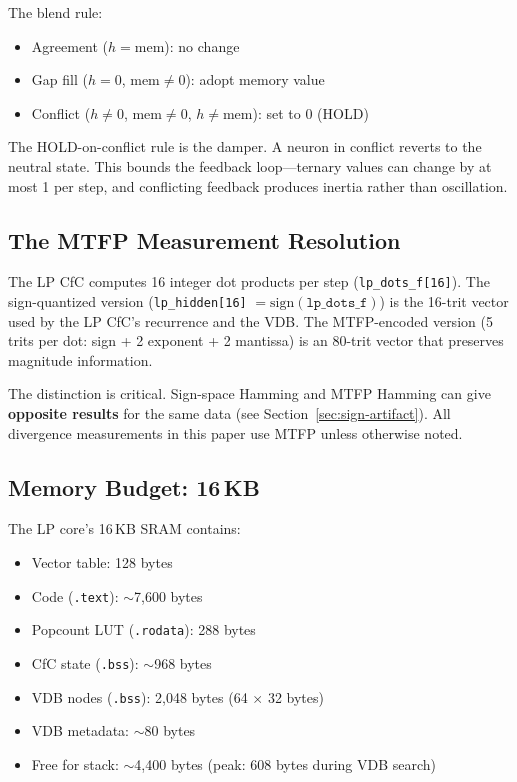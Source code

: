\documentclass[11pt,letterpaper]{article}
\begin{document}
The blend rule:
\begin{itemize}
\item Agreement ($h = \text{mem}$): no change
\item Gap fill ($h = 0$, $\text{mem} \neq 0$): adopt memory value
\item Conflict ($h \neq 0$, $\text{mem} \neq 0$, $h \neq \text{mem}$): set to 0 (HOLD)
\end{itemize}

The HOLD-on-conflict rule is the damper. A neuron in conflict reverts to the neutral state. This bounds the feedback loop---ternary values can change by at most 1 per step, and conflicting feedback produces inertia rather than oscillation.

\subsection{The MTFP Measurement Resolution}

The LP CfC computes 16 integer dot products per step (\texttt{lp\_dots\_f[16]}). The sign-quantized version (\texttt{lp\_hidden[16]} $= \text{sign}(\texttt{lp\_dots\_f})$) is the 16-trit vector used by the LP CfC's recurrence and the VDB. The MTFP-encoded version (5 trits per dot: sign + 2 exponent + 2 mantissa) is an 80-trit vector that preserves magnitude information.

The distinction is critical. Sign-space Hamming and MTFP Hamming can give \textbf{opposite results} for the same data (see Section~\ref{sec:sign-artifact}). All divergence measurements in this paper use MTFP unless otherwise noted.

\subsection{Memory Budget: 16\,KB}

The LP core's 16\,KB SRAM contains:
\begin{itemize}
\item Vector table: 128 bytes
\item Code (\texttt{.text}): $\sim$7,600 bytes
\item Popcount LUT (\texttt{.rodata}): 288 bytes
\item CfC state (\texttt{.bss}): $\sim$968 bytes
\item VDB nodes (\texttt{.bss}): 2,048 bytes (64 $\times$ 32 bytes)
\item VDB metadata: $\sim$80 bytes
\item Free for stack: $\sim$4,400 bytes (peak: 608 bytes during VDB search)
\end{itemize}
\end{document}
